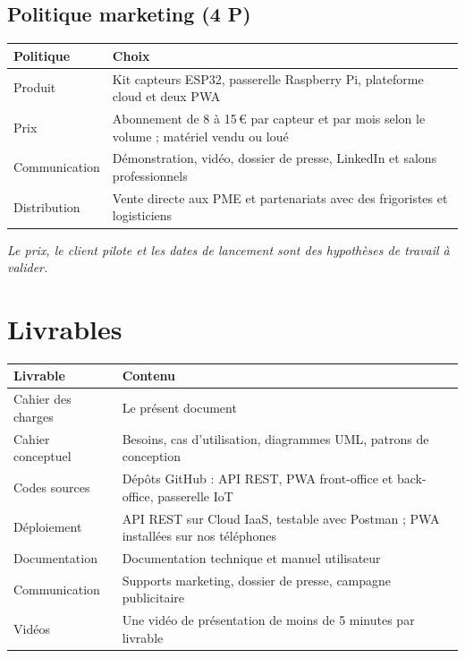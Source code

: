 \documentclass[11pt,a4paper]{article}
\let\oldsection\section
\renewcommand{\section}{\Needspace{10\baselineskip}\oldsection}
\newcommand{\tete}[1]{\textbf{#1}}
\begin{document}
\subsection{Politique marketing (4 P)}
\begin{tabularx}{\textwidth}{@{}l L@{}}
\toprule
\tete{Politique} & \tete{Choix} \\
\midrule
Produit & Kit capteurs ESP32, passerelle Raspberry Pi, plateforme cloud et deux PWA \\
Prix & Abonnement de 8 à 15\,€ par capteur et par mois selon le volume ; matériel vendu ou loué \\
Communication & Démonstration, vidéo, dossier de presse, LinkedIn et salons professionnels \\
Distribution & Vente directe aux PME et partenariats avec des frigoristes et logisticiens \\
\bottomrule
\end{tabularx}

\textit{Le prix, le client pilote et les dates de lancement sont des hypothèses de travail à valider.}

\section{Livrables}
\begin{tabularx}{\textwidth}{@{}l L@{}}
\toprule
\tete{Livrable} & \tete{Contenu} \\
\midrule
Cahier des charges & Le présent document \\
Cahier conceptuel & Besoins, cas d'utilisation, diagrammes UML, patrons de conception \\
Codes sources & Dépôts GitHub : API REST, PWA front-office et back-office, passerelle IoT \\
Déploiement & API REST sur Cloud IaaS, testable avec Postman ; PWA installées sur nos téléphones \\
Documentation & Documentation technique et manuel utilisateur \\
Communication & Supports marketing, dossier de presse, campagne publicitaire \\
Vidéos & Une vidéo de présentation de moins de 5 minutes par livrable \\
\bottomrule
\end{tabularx}

\end{document}
